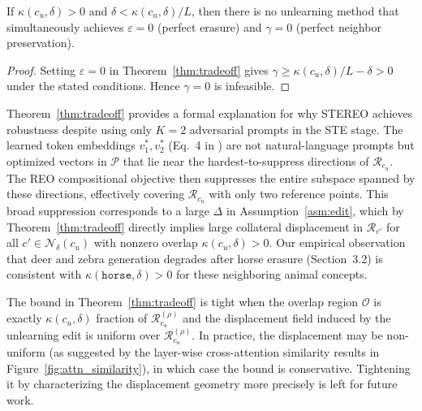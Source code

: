 \begin{corollary}
\label{cor:impossibility}
If $\kappa(c_u, \delta) > 0$ and $\delta < \kappa(c_u,\delta)/L$,
then there is no unlearning method that simultaneously achieves
$\varepsilon = 0$ (perfect erasure) and $\gamma = 0$ (perfect
neighbor preservation).
\end{corollary}

\begin{proof}
Setting $\varepsilon = 0$ in Theorem~\ref{thm:tradeoff} gives
$\gamma \geq \kappa(c_u,\delta)/L - \delta > 0$ under the stated
conditions. Hence $\gamma = 0$ is infeasible.
\end{proof}

\begin{remark}
Theorem~\ref{thm:tradeoff} provides a formal explanation for why
STEREO achieves robustness despite using only $K=2$ adversarial
prompts in the STE stage. The learned token embeddings
$v_1^*, v_2^*$ (Eq.~4 in \cite{stereo}) are not natural-language
prompts but optimized vectors in $\mathcal{P}$ that lie near the
hardest-to-suppress directions of $\mathcal{R}_{c_u}$. The REO
compositional objective then suppresses the entire subspace spanned
by these directions, effectively covering $\mathcal{R}_{c_u}$ with
only two reference points. This broad suppression corresponds to
a large $\Delta$ in Assumption~\ref{asm:edit}, which by
Theorem~\ref{thm:tradeoff} directly implies large collateral
displacement in $\mathcal{R}_{c'}$ for all
$c' \in \mathcal{N}_\delta(c_u)$ with nonzero overlap
$\kappa(c_u,\delta) > 0$. Our empirical observation that deer and
zebra generation degrades after horse erasure (Section~3.2) is
consistent with $\kappa(\texttt{horse}, \delta) > 0$ for these
neighboring animal concepts.
\end{remark}

\begin{remark}[Tightness]
The bound in Theorem~\ref{thm:tradeoff} is tight when the overlap
region $\mathcal{O}$ is exactly $\kappa(c_u,\delta)$ fraction of
$\mathcal{R}_{c_u}^{(\rho)}$ and the displacement field induced by
the unlearning edit is uniform over $\mathcal{R}_{c_u}^{(\rho)}$.
In practice, the displacement may be non-uniform (as suggested by
the layer-wise cross-attention similarity results in
Figure~\ref{fig:attn_similarity}), in which case the bound is
conservative. Tightening it by characterizing the displacement
geometry more precisely is left for future work.
\end{remark}